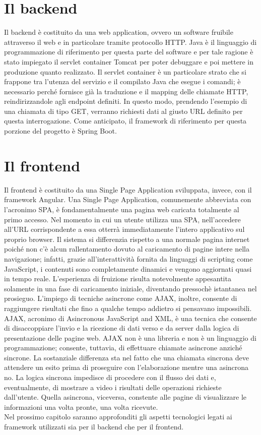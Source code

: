 \section{Il backend}

Il backend è costituito da una web application, ovvero un software fruibile attraverso il web e in particolare tramite protocollo HTTP.
Java è il linguaggio di programmazione di riferimento per questa parte del software e per tale ragione è stato impiegato il servlet container Tomcat per poter debuggare e poi
mettere in produzione quanto realizzato.
Il servlet container è un particolare strato che si frappone tra l'utenza del servizio e il compilato Java che esegue i comandi; è necessario perché fornisce già 
la traduzione e il mapping delle chiamate HTTP, reindirizzandole agli endpoint definiti.
In questo modo, prendendo l'esempio di una chiamata di tipo GET, verranno richiesti dati al giusto URL definito per questa interrogazione.
Come anticipato, il framework di riferimento per questa porzione del progetto è Spring Boot.

\section{Il frontend}

Il frontend è costituito da una Single Page Application sviluppata, invece, con il framework Angular.
Una Single Page Application, comunemente abbreviata con l'acronimo SPA, è fondamentalmente una pagina web caricata totalmente al primo accesso.
Nel momento in cui un utente utilizza una SPA, nell'accedere all'URL corrispondente a essa otterrà immediatamente l'intero applicativo sul proprio browser.
Il sistema si differenzia rispetto a una normale pagina internet poiché non c'è alcun rallentamento dovuto al caricamento di pagine intere nella navigazione; infatti, grazie 
all'interattività fornita da linguaggi di scripting come JavaScript, i contenuti sono completamente dinamici e vengono aggiornati quasi in tempo reale.
L'esperienza di fruizione risulta notevolmente appesantita solamente in una fase di caricamento iniziale, diventando pressochè istantanea nel prosieguo.
L'impiego di tecniche asincrone come AJAX, inoltre, consente di raggiungere risultati che fino a qualche tempo addietro si pensavano impossibili.
AJAX, acronimo di Asincronous JavaScript and XML, è una tecnica che consente di disaccoppiare l'invio e la ricezione di dati verso e da server dalla logica di presentazione delle pagine web.
AJAX non è una libreria e non è un linguaggio di programmazione; consente, tuttavia, di effettuare chiamate asincrone anziché sincrone.
La sostanziale differenza sta nel fatto che una chiamata sincrona deve attendere un esito prima di proseguire con l'elaborazione mentre una asincrona no.
La logica sincrona impedisce di procedere con il flusso dei dati e, eventualmente, di mostrare a video i risultati delle operazioni richieste dall'utente.
Quella asincrona, viceversa, constente alle pagine di visualizzare le informazioni una volta pronte, una volta ricevute.
\\
Nel prossimo capitolo saranno approfonditi gli aspetti tecnologici legati ai framework utilizzati sia per il backend che per il frontend.
